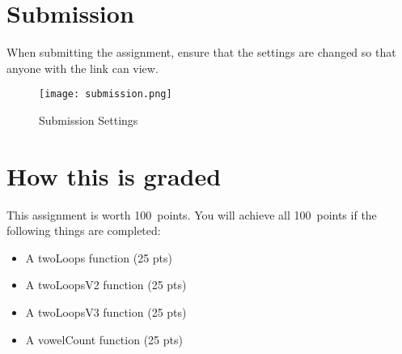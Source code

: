 \documentclass{article}
\newcommand{\AValue}{100}
\begin{document}
\section*{Submission}
When submitting the assignment, ensure that the settings are changed so that anyone with the link can view.
\begin{figure}[H]
  \centering
  \texttt{[image: submission.png]}
  \caption{Submission Settings}
\end{figure}

\section*{How this is graded}
This assignment is worth \AValue \ points. You will achieve all \AValue \   points if the following things are completed:
\begin{itemize}
    \item A twoLoops function (25 pts)
    \item A twoLoopsV2 function (25 pts)
    \item A twoLoopsV3 function (25 pts)
    \item A vowelCount function (25 pts)
\end{itemize}
\end{document}
